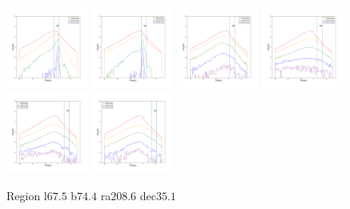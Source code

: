 \documentclass[12pt,prd]{article}
\begin{document}
\begin{figure}[h!]
\includegraphics[width=0.24\textwidth]{../figures/scanning_plotsgaiascan_l67_5_b74_4_ra208_6_dec35_1_npy_12.pdf}
\includegraphics[width=0.24\textwidth]{../figures/scanning_plotsgaiascan_l67_5_b74_4_ra208_6_dec35_1_npy_13.pdf}
\includegraphics[width=0.24\textwidth]{../figures/scanning_plotsgaiascan_l67_5_b74_4_ra208_6_dec35_1_npy_14.pdf}
\includegraphics[width=0.24\textwidth]{../figures/scanning_plotsgaiascan_l67_5_b74_4_ra208_6_dec35_1_npy_15.pdf}
\includegraphics[width=0.24\textwidth]{../figures/scanning_plotsgaiascan_l67_5_b74_4_ra208_6_dec35_1_npy_16.pdf}
\includegraphics[width=0.24\textwidth]{../figures/scanning_plotsgaiascan_l67_5_b74_4_ra208_6_dec35_1_npy_17.pdf}
\caption{Region l$67.5$ b$74.4$ ra$208.6$ dec$35.1$}
\end{figure}
\end{document}
